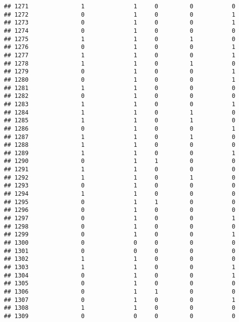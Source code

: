 \documentclass[]{article}
\begin{document}
\begin{verbatim}
## 1271               1              1     0         0           0
## 1272               0              1     0         0           1
## 1273               0              1     0         0           1
## 1274               0              1     0         0           0
## 1275               1              1     0         1           0
## 1276               0              1     0         0           1
## 1277               1              1     0         0           1
## 1278               1              1     0         1           0
## 1279               0              1     0         0           1
## 1280               0              1     0         0           1
## 1281               1              1     0         0           0
## 1282               0              1     0         0           0
## 1283               1              1     0         0           1
## 1284               1              1     0         1           0
## 1285               1              1     0         1           0
## 1286               0              1     0         0           1
## 1287               1              1     0         1           0
## 1288               1              1     0         0           0
## 1289               1              1     0         0           1
## 1290               0              1     1         0           0
## 1291               1              1     0         0           0
## 1292               1              1     0         1           0
## 1293               0              1     0         0           0
## 1294               1              1     0         0           0
## 1295               0              1     1         0           0
## 1296               0              1     0         0           0
## 1297               0              1     0         0           1
## 1298               0              1     0         0           0
## 1299               0              1     0         0           1
## 1300               0              0     0         0           0
## 1301               0              0     0         0           0
## 1302               1              1     0         0           0
## 1303               1              1     0         0           1
## 1304               0              1     0         0           1
## 1305               0              1     0         0           0
## 1306               0              1     1         0           0
## 1307               0              1     0         0           1
## 1308               1              1     0         0           0
## 1309               0              0     0         0           0

\end{verbatim}
\end{document}
